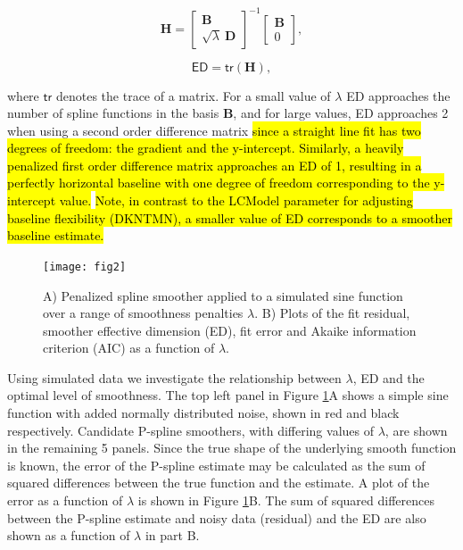 \documentclass[num-refs]{wiley-article}
\newcommand{\revone}[2]{\hl{#1}\marginnote{\hl{#2}}}
\begin{document}
\begin{equation}
  \mathbf{H} =
  \begin{bmatrix}
    \mathbf{B} \\ \sqrt{\lambda}\ \mathbf{D}
  \end{bmatrix}^{-1}
  \begin{bmatrix}
    \mathbf{B} \\ 0
  \end{bmatrix},
\end{equation}

\begin{equation}
  \textsf{ED} = \textsf{tr}(\mathbf{H}),
\end{equation}

where $\textsf{tr}$ denotes the trace of a matrix. For a small value of $\lambda$ ED approaches the number of spline functions in the basis $\mathbf{B}$, and for large values, ED approaches 2 when using a second order difference matrix \revone{since a straight line fit has two degrees of freedom: the gradient and the y-intercept. Similarly, a heavily penalized first order difference matrix approaches an ED of 1, resulting in a perfectly horizontal baseline with one degree of freedom corresponding to the y-intercept value.}{R1.8} \revone{Note, in contrast to the LCModel parameter for adjusting baseline flexibility (DKNTMN), a smaller value of ED corresponds to a smoother baseline estimate.}{R2.7}

\begin{figure}
  \begin{center}
    \texttt{[image: fig2]}
    \caption{A) Penalized spline smoother applied to a simulated sine function over a range of smoothness penalties $\lambda$. B) Plots of the fit residual, smoother effective dimension (ED), fit error and Akaike information criterion (AIC) as a function of $\lambda$.}
    \label{pspline_error}
  \end{center}
\end{figure}

Using simulated data we investigate the relationship between $\lambda$, ED and the optimal level of smoothness. The top left panel in Figure \ref{pspline_error}A shows a simple sine function with added normally distributed noise, shown in red and black respectively. Candidate P-spline smoothers, with differing values of $\lambda$, are shown in the remaining 5 panels. Since the true shape of the underlying smooth function is known, the error of the P-spline estimate may be calculated as the sum of squared differences between the true function and the estimate. A plot of the error as a function of $\lambda$ is shown in Figure \ref{pspline_error}B. The sum of squared differences between the P-spline estimate and noisy data (residual) and the ED are also shown as a function of $\lambda$ in part B.
\end{document}
